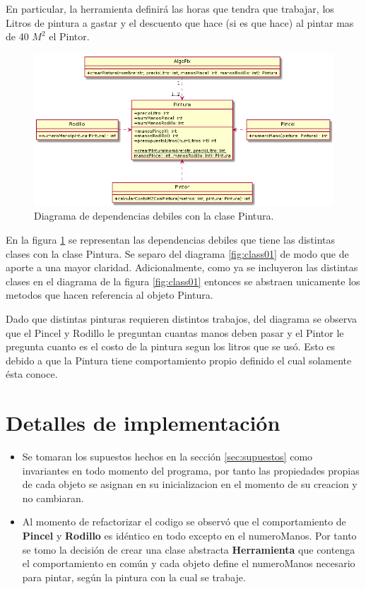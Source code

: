 \documentclass[titlepage,a4paper]{article}
\begin{document}
  En particular, la herramienta definirá las horas que tendra que trabajar, los Litros de pintura a gastar y 
  el descuento que hace (si es que hace) al pintar mas de 40 $M^2$ el Pintor. 

\begin{figure}[H]
\centering
\includegraphics[width=1\textwidth]{diagrama_clase02.png}
\caption{\label{fig:class02}Diagrama de dependencias debiles con la clase Pintura.}
\end{figure}

En la figura \ref{fig:class02} se representan las dependencias debiles que tiene las distintas clases con la clase Pintura. Se separo del diagrama \ref{fig:class01} de modo que
 de aporte a una mayor claridad. Adicionalmente, como ya se incluyeron las distintas clases en el diagrama de la figura \ref{fig:class01} 
entonces se abstraen unicamente los metodos que hacen referencia al objeto Pintura.\newline

Dado que distintas pinturas requieren distintos trabajos, del diagrama se observa que el Pincel y Rodillo le preguntan cuantas manos deben pasar y el Pintor le pregunta
cuanto es el costo de la pintura segun los litros que se usó. Esto es debido a que la Pintura tiene comportamiento propio definido el cual solamente ésta conoce.


\section{Detalles de implementación}\label{sec:implementacion}
\begin{itemize}  
  \item Se tomaran los supuestos hechos en la sección \ref{sec:supuestos} como invariantes en todo momento del programa,
  por tanto las propiedades propias de cada objeto se asignan en su inicializacion en el momento de su creacion y no cambiaran.

  \item Al momento de refactorizar el codigo se observó que el comportamiento de \textbf{Pincel} y \textbf{Rodillo} es idéntico en todo excepto en el numeroManos. 
  Por tanto se tomo la decisión de crear una clase abstracta \textbf{Herramienta} que contenga el comportamiento en común y cada objeto define el numeroManos 
  necesario para pintar, según la pintura con la cual se trabaje.
\end{itemize}
\end{document}
